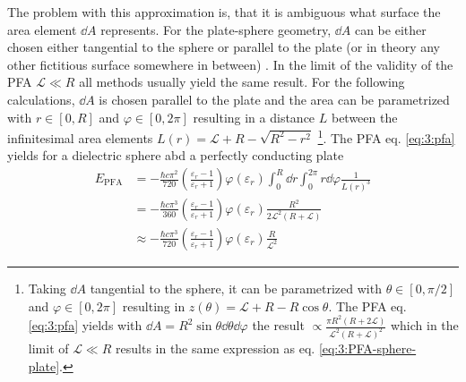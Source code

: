 The problem with this approximation is, that it is ambiguous what surface the area element $\dd A$ represents. For the plate-sphere geometry, $\dd A$ can be either chosen either tangential to the sphere or parallel to the plate (or in theory any other fictitious surface somewhere in between) \cite{Bulgac_2006}.
In the limit of the validity of the PFA $\mathscr{L} \ll R$ all methods usually yield the same result.
For the following calculations, $\dd A$ is chosen parallel to the plate and the area can be parametrized with $r\in [0, R]$ and $\varphi \in [0, 2\pi]$ resulting in a distance $L$ between the infinitesimal area elements $L(r) = \mathscr{L} + R - \sqrt{R^2 - r^2}$ \footnote{Taking $\dd A$ tangential to the sphere, it can be parametrized with $\theta \in [0, \pi/2]$ and $\varphi \in [0, 2\pi]$ resulting in $z(\theta) = \mathscr{L} + R - R\cos\theta$. The PFA eq. \eqref{eq:3:pfa} yields with $\dd A = R^2\sin\theta\dd\theta\dd\varphi$ the result $\propto \frac{\pi R^2(R + 2\mathscr{L})}{\mathscr{L}^2(R+\mathscr{L})^2}$ which in the limit of $\mathscr{L} \ll R$ results in the same expression as eq. \eqref{eq:3:PFA-sphere-plate}.}. The PFA eq. \eqref{eq:3:pfa} yields for a dielectric sphere abd a perfectly conducting plate
\begin{align}
  E_\mathrm{PFA} &= -\frac{\hbar c \pi^2}{720} \left(\frac{\varepsilon_r - 1}{\varepsilon_r + 1}\right) \varphi(\varepsilon_r) \int_0^R \dd r \int_0^{2\pi} r\dd \varphi \frac{1}{L(r)^3} \\
  &= -\frac{\hbar c \pi^3}{360} \left(\frac{\varepsilon_r - 1}{\varepsilon_r + 1}\right) \varphi(\varepsilon_r) \frac{R^2}{2\mathscr{L}^2(R + \mathscr{L})} \\
  &\approx -\frac{\hbar c \pi^3}{720} \left(\frac{\varepsilon_r - 1}{\varepsilon_r + 1}\right) \varphi(\varepsilon_r) \frac{R}{\mathscr{L}^2} \label{eq:3:PFA-sphere-plate}
\end{align}
